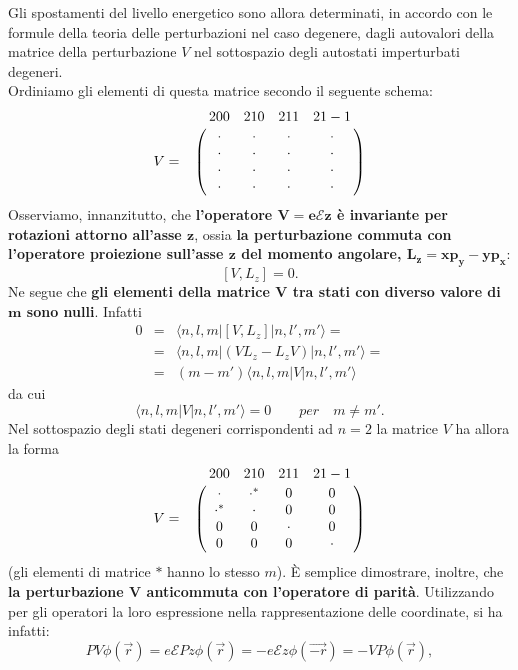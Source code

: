 \vspace{1cm}
Gli spostamenti del livello energetico sono allora determinati, in accordo con le formule della teoria delle perturbazioni nel caso degenere, dagli autovalori della matrice della perturbazione $V$ nel sottospazio degli autostati imperturbati degeneri. \\ Ordiniamo gli elementi di questa matrice secondo il seguente schema:
\begin{equation}  
V=
\bordermatrix{~&200&210&211&21-1\cr
& \cdot & \cdot & \cdot & \cdot \cr
& \cdot & \cdot & \cdot & \cdot \cr
& \cdot & \cdot & \cdot & \cdot \cr
& \cdot & \cdot & \cdot & \cdot \cr}
\end{equation}
Osserviamo, innanzitutto, che \textbf{l'operatore $\boldsymbol{V=e\mathcal{E}z}$ è invariante per rotazioni attorno all'asse $\boldsymbol{z}$}, ossia \textbf{la perturbazione commuta con l'operatore proiezione sull'asse $\boldsymbol{z}$ del momento angolare, $\boldsymbol{L_z=xp_y-yp_x}$}:
\begin{equation} 
\left[V,L_z\right]=0.
\end{equation}
Ne segue che \textbf{gli elementi della matrice $\boldsymbol{V}$ tra stati con diverso valore di $\boldsymbol{m}$ sono nulli}. Infatti 
\begin{eqnarray} 
0 & = & \langle n,l,m| \left[V,L_z\right] |n,l',m'\rangle= \nonumber \\
 & = &\langle n,l,m | \left(VL_z-L_zV\right)|n,l',m'\rangle= \nonumber \\
 & = &\left( m-m' \right) \langle n,l,m |V |n,l',m'\rangle
\end{eqnarray}
da cui
\begin{equation}
\langle n,l,m | V |n,l',m'\rangle=0 \qquad per \quad m \neq m'.
\end{equation}
Nel sottospazio degli stati degeneri corrispondenti ad $n=2$ la matrice $V$ ha allora la forma
\begin{equation} 
V=
\bordermatrix{~&200&210&211&21-1\cr
& \cdot & \cdot^{*} & 0 & 0 \cr
& \cdot^{*} & \cdot & 0 & 0 \cr
& 0 & 0 & \cdot & 0 \cr
& 0 & 0 & 0 & \cdot \cr}
\end{equation}
(gli elementi di matrice $*$ hanno lo stesso $m$).
È semplice dimostrare, inoltre, che \textbf{la perturbazione $\boldsymbol{V}$ anticommuta con l'operatore di parità}. Utilizzando per gli operatori la loro espressione nella rappresentazione delle coordinate, si ha infatti:
\begin{equation}
PV\phi(\vec{r})=e\mathcal{E}Pz\phi(\vec{r})=-e\mathcal{E}z\phi(\vec{-r})=-VP\phi(\vec{r}),
\end{equation}
